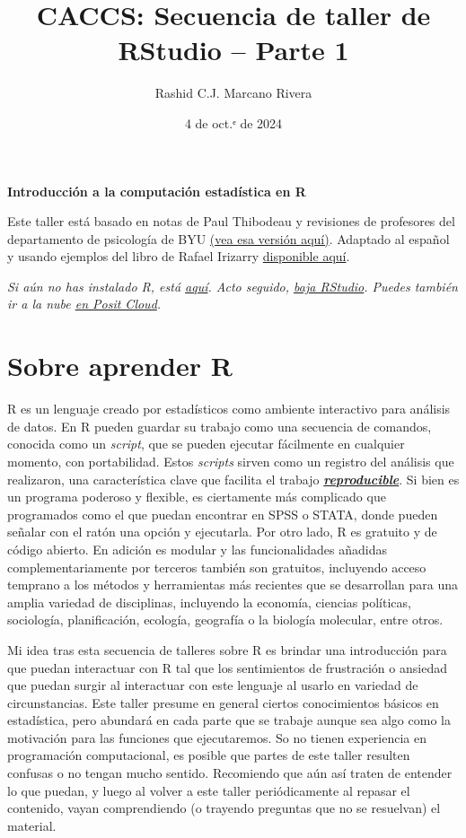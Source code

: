 \documentclass[
]{article}
\title{CACCS: Secuencia de taller de RStudio -- Parte 1}
\author{Rashid C.J. Marcano Rivera}
\date{4 de oct.ᵉ de 2024}
\begin{document}
\maketitle

{
\setcounter{tocdepth}{2}
\tableofcontents
}
\textbf{Introducción a la computación estadística en R}

Este taller está basado en notas de Paul Thibodeau y revisiones de
profesores del departamento de psicología de BYU
\href{https://fhssrsc.byu.edu/r-workshop}{(vea esa versión aquí)}.
Adaptado al español y usando ejemplos del libro de Rafael Irizarry
\href{https://leanpub.com/dslibro}{disponible aquí}.

\emph{Si aún no has instalado R, está
\href{http://cran.us.r-project.org/}{aquí}. Acto seguido,
\href{https://posit.co/download/rstudio-desktop/}{baja RStudio}. Puedes
también ir a la nube \href{https://posit.cloud/}{en Posit Cloud}.}

\section{Sobre aprender R}\label{sobre-aprender-r}

R es un lenguaje creado por estadísticos como ambiente interactivo para
análisis de datos. En R pueden guardar su trabajo como una secuencia de
comandos, conocida como un \emph{script}, que se pueden ejecutar
fácilmente en cualquier momento, con portabilidad. Estos \emph{scripts}
sirven como un registro del análisis que realizaron, una característica
clave que facilita el trabajo \ul{\textbf{\emph{reproducible}}}. Si bien
es un programa poderoso y flexible, es ciertamente más complicado que
programados como el que puedan encontrar en SPSS o STATA, donde pueden
señalar con el ratón una opción y ejecutarla. Por otro lado, R es
gratuito y de código abierto. En adición es modular y las
funcionalidades añadidas complementariamente por terceros también son
gratuitos, incluyendo acceso temprano a los métodos y herramientas más
recientes que se desarrollan para una amplia variedad de disciplinas,
incluyendo la economía, ciencias políticas, sociología, planificación,
ecología, geografía o la biología molecular, entre otros.

Mi idea tras esta secuencia de talleres sobre R es brindar una
introducción para que puedan interactuar con R tal que los sentimientos
de frustración o ansiedad que puedan surgir al interactuar con este
lenguaje al usarlo en variedad de circunstancias. Este taller presume en
general ciertos conocimientos básicos en estadística, pero abundará en
cada parte que se trabaje aunque sea algo como la motivación para las
funciones que ejecutaremos. So no tienen experiencia en programación
computacional, es posible que partes de este taller resulten confusas o
no tengan mucho sentido. Recomiendo que aún así traten de entender lo
que puedan, y luego al volver a este taller periódicamente al repasar el
contenido, vayan comprendiendo (o trayendo preguntas que no se
resuelvan) el material.
\end{document}
